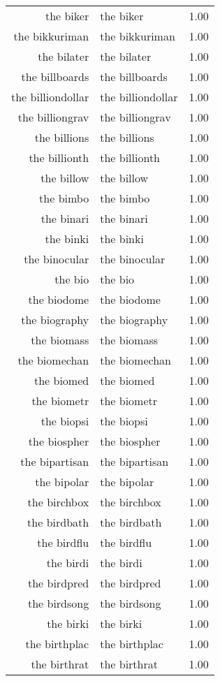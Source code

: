 \begin{table}[ht]
\begin{tabular}{rlr}
  the biker & the biker & 1.00 \\ 
  the bikkuriman & the bikkuriman & 1.00 \\ 
  the bilater & the bilater & 1.00 \\ 
  the billboards & the billboards & 1.00 \\ 
  the billiondollar & the billiondollar & 1.00 \\ 
  the billiongrav & the billiongrav & 1.00 \\ 
  the billions & the billions & 1.00 \\ 
  the billionth & the billionth & 1.00 \\ 
  the billow & the billow & 1.00 \\ 
  the bimbo & the bimbo & 1.00 \\ 
  the binari & the binari & 1.00 \\ 
  the binki & the binki & 1.00 \\ 
  the binocular & the binocular & 1.00 \\ 
  the bio & the bio & 1.00 \\ 
  the biodome & the biodome & 1.00 \\ 
  the biography & the biography & 1.00 \\ 
  the biomass & the biomass & 1.00 \\ 
  the biomechan & the biomechan & 1.00 \\ 
  the biomed & the biomed & 1.00 \\ 
  the biometr & the biometr & 1.00 \\ 
  the biopsi & the biopsi & 1.00 \\ 
  the biospher & the biospher & 1.00 \\ 
  the bipartisan & the bipartisan & 1.00 \\ 
  the bipolar & the bipolar & 1.00 \\ 
  the birchbox & the birchbox & 1.00 \\ 
  the birdbath & the birdbath & 1.00 \\ 
  the birdflu & the birdflu & 1.00 \\ 
  the birdi & the birdi & 1.00 \\ 
  the birdpred & the birdpred & 1.00 \\ 
  the birdsong & the birdsong & 1.00 \\ 
  the birki & the birki & 1.00 \\ 
  the birthplac & the birthplac & 1.00 \\ 
  the birthrat & the birthrat & 1.00 \\ 

\end{tabular}
\end{table}
